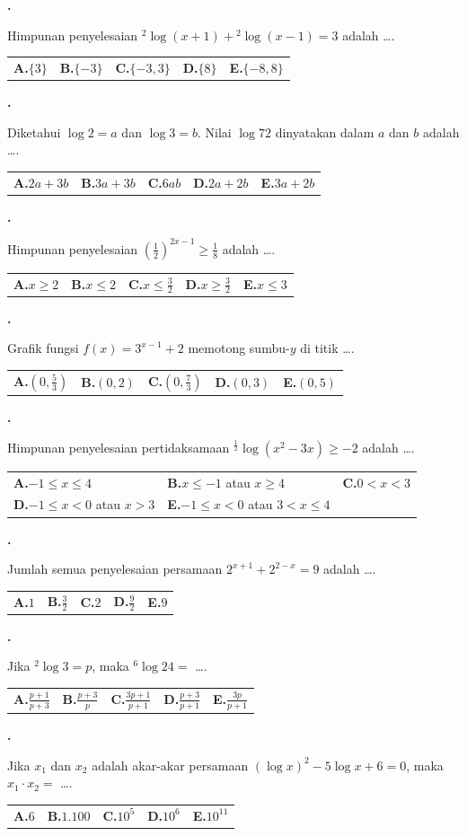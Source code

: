 \documentclass[a4paper,11pt]{article}
\newcommand{\dis}{\displaystyle}
\newcommand{\alog}[2]{{}^{#1}\!\log #2}
\newcounter{no}
\newcommand{\soal}[2]{\par\vspace{0.75em}\stepcounter{no}\noindent
  \begin{minipage}[t]{1.8em}\textbf{\theno.}\end{minipage}%
  \begin{minipage}[t]{\dimexpr\linewidth-1.8em\relax}#1\par\vspace{0.35em}#2\end{minipage}\par}
\begin{document}
\soal{Himpunan penyelesaian $\alog{2}{(x+1)}+\alog{2}{(x-1)}=3$ adalah \dots.}{\begin{tabularx}{\linewidth}{@{}*{5}{X}@{}}\textbf{A.}\;$\{3\}$ & \textbf{B.}\;$\{-3\}$ & \textbf{C.}\;$\{-3,3\}$ & \textbf{D.}\;$\{8\}$ & \textbf{E.}\;$\{-8,8\}$\end{tabularx}}
\soal{Diketahui $\log 2=a$ dan $\log 3=b$. Nilai $\log 72$ dinyatakan dalam $a$ dan $b$ adalah \dots.}{\begin{tabularx}{\linewidth}{@{}*{5}{X}@{}}\textbf{A.}\;$2a+3b$ & \textbf{B.}\;$3a+3b$ & \textbf{C.}\;$6ab$ & \textbf{D.}\;$2a+2b$ & \textbf{E.}\;$3a+2b$\end{tabularx}}
\soal{Himpunan penyelesaian $\left(\dis\frac{1}{2}\right)^{2x-1}\ge\dis\frac{1}{8}$ adalah \dots.}{\begin{tabularx}{\linewidth}{@{}*{5}{X}@{}}\textbf{A.}\;$x\ge2$ & \textbf{B.}\;$x\le2$ & \textbf{C.}\;$x\le\dis\frac32$ & \textbf{D.}\;$x\ge\dis\frac32$ & \textbf{E.}\;$x\le3$\end{tabularx}}
\soal{Grafik fungsi $f(x)=3^{x-1}+2$ memotong sumbu-$y$ di titik \dots.}{\begin{tabularx}{\linewidth}{@{}*{5}{X}@{}}\textbf{A.}\;$\left(0,\dis\frac53\right)$ & \textbf{B.}\;$(0,2)$ & \textbf{C.}\;$\left(0,\dis\frac73\right)$ & \textbf{D.}\;$(0,3)$ & \textbf{E.}\;$(0,5)$\end{tabularx}}
\soal{Himpunan penyelesaian pertidaksamaan $\alog{\frac{1}{2}}{(x^{2}-3x)}\ge-2$ adalah \dots.}{\begin{tabularx}{\linewidth}{@{}*{3}{X}@{}}\textbf{A.}\;$-1\le x\le4$ & \textbf{B.}\;$x\le-1$ atau $x\ge4$ & \textbf{C.}\;$0<x<3$\\[3pt] \textbf{D.}\;$-1\le x<0$ atau $x>3$ & \textbf{E.}\;$-1\le x<0$ atau $3<x\le4$ & \end{tabularx}}
\soal{Jumlah semua penyelesaian persamaan $2^{x+1}+2^{2-x}=9$ adalah \dots.}{\begin{tabularx}{\linewidth}{@{}*{5}{X}@{}}\textbf{A.}\;$1$ & \textbf{B.}\;$\dis\frac32$ & \textbf{C.}\;$2$ & \textbf{D.}\;$\dis\frac92$ & \textbf{E.}\;$9$\end{tabularx}}
\soal{Jika $\alog{2}{3}=p$, maka $\alog{6}{24}=$ \dots.}{\begin{tabularx}{\linewidth}{@{}*{5}{X}@{}}\textbf{A.}\;$\dis\frac{p+1}{p+3}$ & \textbf{B.}\;$\dis\frac{p+3}{p}$ & \textbf{C.}\;$\dis\frac{3p+1}{p+1}$ & \textbf{D.}\;$\dis\frac{p+3}{p+1}$ & \textbf{E.}\;$\dis\frac{3p}{p+1}$\end{tabularx}}
\soal{Jika $x_{1}$ dan $x_{2}$ adalah akar-akar persamaan $(\log x)^{2}-5\log x+6=0$, maka $x_{1}\cdot x_{2}=$ \dots.}{\begin{tabularx}{\linewidth}{@{}*{5}{X}@{}}\textbf{A.}\;$6$ & \textbf{B.}\;$1.100$ & \textbf{C.}\;$10^{5}$ & \textbf{D.}\;$10^{6}$ & \textbf{E.}\;$10^{11}$\end{tabularx}}
\end{document}
